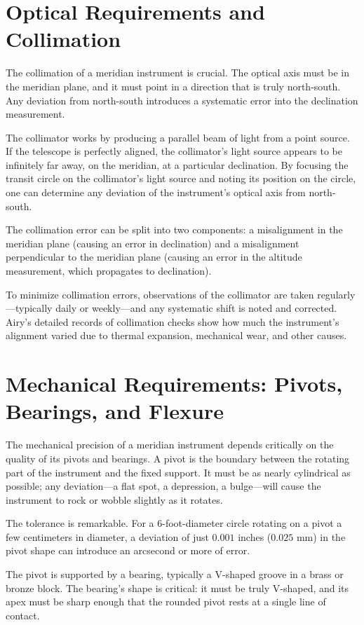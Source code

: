 \section{Optical Requirements and Collimation}

The collimation of a meridian instrument is crucial. The optical axis must be in the meridian plane, and it must point in a direction that is truly north-south. Any deviation from north-south introduces a systematic error into the declination measurement.

The collimator works by producing a parallel beam of light from a point source. If the telescope is perfectly aligned, the collimator's light source appears to be infinitely far away, on the meridian, at a particular declination. By focusing the transit circle on the collimator's light source and noting its position on the circle, one can determine any deviation of the instrument's optical axis from north-south.

The collimation error can be split into two components: a misalignment in the meridian plane (causing an error in declination) and a misalignment perpendicular to the meridian plane (causing an error in the altitude measurement, which propagates to declination).

To minimize collimation errors, observations of the collimator are taken regularly—typically daily or weekly—and any systematic shift is noted and corrected. Airy's detailed records of collimation checks show how much the instrument's alignment varied due to thermal expansion, mechanical wear, and other causes.

\section{Mechanical Requirements: Pivots, Bearings, and Flexure}

The mechanical precision of a meridian instrument depends critically on the quality of its pivots and bearings. A pivot is the boundary between the rotating part of the instrument and the fixed support. It must be as nearly cylindrical as possible; any deviation—a flat spot, a depression, a bulge—will cause the instrument to rock or wobble slightly as it rotates.

The tolerance is remarkable. For a 6-foot-diameter circle rotating on a pivot a few centimeters in diameter, a deviation of just $0.001$ inches ($0.025$ mm) in the pivot shape can introduce an arcsecond or more of error.

The pivot is supported by a bearing, typically a V-shaped groove in a brass or bronze block. The bearing's shape is critical: it must be truly V-shaped, and its apex must be sharp enough that the rounded pivot rests at a single line of contact.

